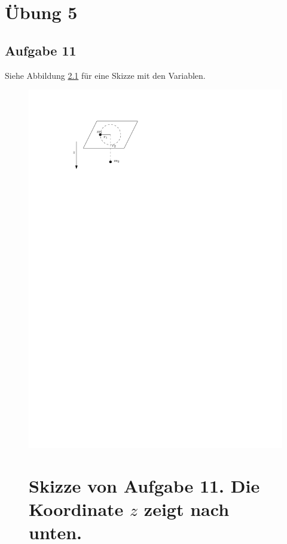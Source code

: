 \chapter{Übung 5}

\section*{Aufgabe 11}

Siehe Abbildung \ref{fig:ueb5_aufgabe11} für eine Skizze mit den Variablen.

\begin{figure}[h]
	\centering
	\includegraphics{figures/ueb5/aufgabe11}
	\label{fig:ueb5_aufgabe11}
	\chapter{Skizze von Aufgabe 11. Die Koordinate $z$ zeigt nach unten.}
\end{figure}

